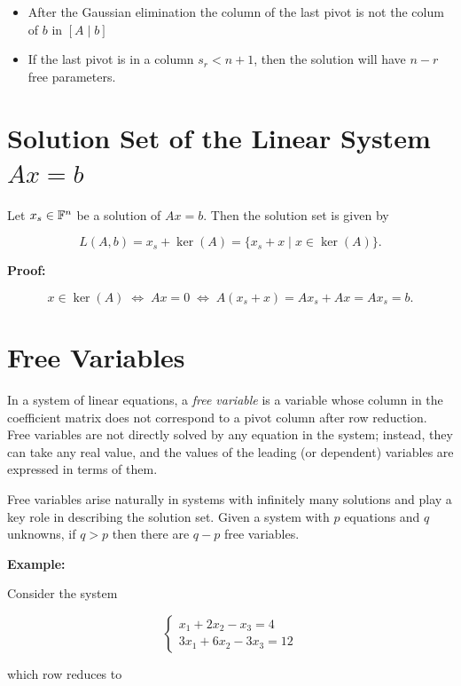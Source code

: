 \begin{itemize}

    \item After the Gaussian elimination the column of the last pivot is not the colum of \(b\) in \([A \mid b]\)

    \item  If the last pivot is in a column \(s_r < n + 1\), then the solution will have \(n - r\) free parameters.

\end{itemize}

\section{Solution Set of the Linear System \texorpdfstring{\(Ax = b\)}{}}

Let \(x_s \in \mathbb{F}^n\) be a solution of \(Ax = b\). Then the solution set is given by

\[
    L(A, b) = x_s + \ker(A) = \{x_s + x \mid x \in \ker(A)\}.
\]

\textbf{Proof:}

\[
    x \in \ker(A) \;\iff\; Ax = 0 \;\iff\; A(x_s + x) = Ax_s + Ax = Ax_s = b.
\]

\section{Free Variables}

In a system of linear equations, a \emph{free variable} is a variable whose column in the coefficient matrix does not correspond to a pivot column 
after row reduction. Free variables are not directly solved by any equation in the system; instead, they can take any real value, and the values of 
the leading (or dependent) variables are expressed in terms of them.

Free variables arise naturally in systems with infinitely many solutions and play a key role in describing the solution set. Given a system with 
\(p\) equations and \(q\) unknowns, if \(q > p\) then there are \(q - p\) free variables.

\textbf{Example:}

Consider the system

\[
    \begin{cases}
        x_1 + 2x_2 - x_3 = 4 \\
        3x_1 + 6x_2 - 3x_3 = 12
    \end{cases}
\]

which row reduces to

